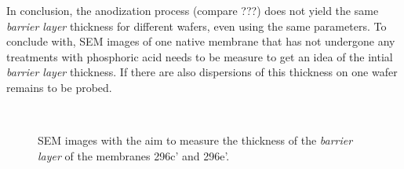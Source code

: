 \documentclass[../thesis.tex]{subfiles}
\begin{document}
          In conclusion, the anodization process (compare ???) does not yield the same \textit{barrier layer} thickness for different wafers, even using the same parameters. To conclude with, SEM images of one native membrane that has not undergone any treatments with phosphoric acid needs to be measure to get an idea of the intial \textit{barrier layer} thickness. If there are also dispersions of this thickness on one wafer remains to be probed.

          \begin{figure}[p]
            \centering
             \\
            \caption{SEM images with the aim to measure the thickness of the \textit{barrier layer} of the membranes 296c' and 296e'.}
            \label{fig:barrier-layer-sems}
          \end{figure}
\end{document}
